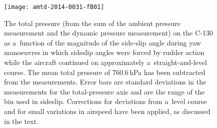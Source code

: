 \documentclass[amtd, online, hvmath]{copernicus}
\begin{document}
\appendixfigures
\appendixfigures

\begin{figure}
\texttt{[image: amtd-2014-0031-fB01]}
\caption{The total pressure (from the sum of the ambient pressure
  measurement and the dynamic pressure measurement) on the C-130 as
  a~function of the magnitude of the side-slip angle during yaw
  manoeuvres in which sideslip angles were forced by rudder action
  while the aircraft continued on approximately a~straight-and-level
  course. The mean total pressure of 760.6\,hPa has been subtracted
  from the measurements. Error bars are standard deviations in the
  measurements for the total-pressure axis and are the range of the
  bin used in sideslip.  Corrections for deviations from a~level
  course and for small variations in airspeed have been applied, as
  discussed in the text.}
\label{fig:PtvsSSLIP}
\end{figure}
\end{document}
